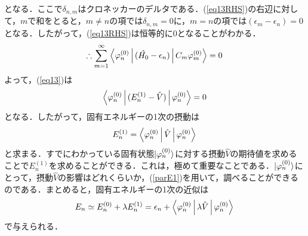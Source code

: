 となる．ここで$\delta_{n,m}$はクロネッカーのデルタである．(\ref{eq13RHS})の右辺に対して，$m$で和をとると，$m\neq n$の項では$\delta_{n,m}=0$に，$m=n$の項では$(\epsilon_{m}-\epsilon_{n})=0$となる．したがって，(\ref{eq13RHS})は恒等的に$0$となることがわかる．
%
　\begin{align}
\therefore\displaystyle\sum_{m=1}^\infty\Braket{\varphi_{n}^{(0)}|(\hat{H_0}-\epsilon_{n})|C_{m}\varphi_{m}^{(0)}}=0
\end{align}
よって，(\ref{eq13})は
　\begin{align}
\Braket{\varphi_{n}^{(0)}|(E_{n}^{(1)}-\hat{V})|\varphi_{n}^{(0)}}=0
\end{align}
となる．したがって，固有エネルギーの1次の摂動は
%
　\begin{align}\label{parE1}
E_{n}^{(1)}=\Braket{\varphi_{n}^{(0)}|\hat{V}|\varphi_{n}^{(0)}}
\end{align}
と求まる．すでにわかっている固有状態$\ket{\varphi_{n}^{(0)}}$に対する摂動$\hat{V}$の期待値を求めることで$E_{n}^{(1)}$を求めることができる．これは，極めて重要なことである．$\ket{\varphi_{n}^{(0)}}$にとって，摂動$\hat{V}$の影響はどれくらいか，(\ref{parE1})を用いて，調べることができるのである．まとめると，固有エネルギーの1次の近似は
\begin{align}
E_n\simeq E_{n}^{(0)}+\lambda E_{n}^{(1)}=\epsilon_n+\Braket{\varphi_{n}^{(0)}|\lambda\hat{V}|\varphi_{n}^{(0)}}
\end{align}
で与えられる．\\
　




























%

